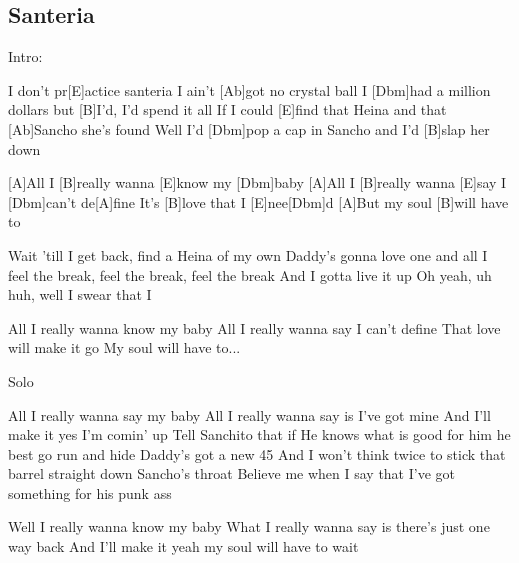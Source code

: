 \subsection*{Santeria   }
\begin{guitar}
Intro:\qquad {}


I don't pr[E]actice santeria I ain't [Ab]got no crystal ball
I [Dbm]had a million dollars but [B]I'd, I'd spend it all
If I could [E]find that Heina and that [Ab]Sancho she's found
Well I'd [Dbm]pop a cap in Sancho and I'd [B]slap her down



[A]All I [B]really wanna [E]know my [Dbm]baby
[A]All I [B]really wanna [E]say I [Dbm]can't de[A]fine
It's [B]love that I [E]nee[Dbm]d 
[A]But my soul [B]will have to
 


Wait 'till I get back, find a Heina of my own
Daddy's gonna love one and all
I feel the break, feel the break, feel the break
And I gotta live it up Oh yeah, uh huh, well I swear that I



All I really wanna know my baby
All I really wanna say I can't define
That love will make it go
My soul will have to...


Solo



All I really wanna say my baby
All I really wanna say is I've got mine
And I'll make it yes I'm comin' up
Tell Sanchito that if
He knows what is good for him he best go run and hide
Daddy's got a new 45
And I won't think twice to stick that barrel straight down Sancho's throat
Believe me when I say that I've got something for his punk ass



Well I really wanna know my baby
What I really wanna say is there's just one way back
And I'll make it
yeah my soul will have to wait

\end{guitar}
